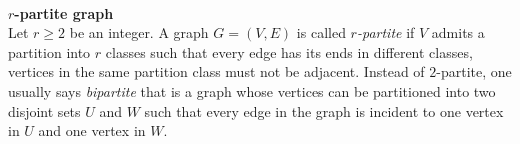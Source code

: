 \documentclass[12pt]{report}
\begin{document}
\\
{\bf $r$-partite graph}\\ Let $r\geq 2$ be an integer. A graph
$G=(V,E)$ is called {\em $r$-partite} if $V$ admits a partition into
$r$ classes such that every edge has its ends in different classes,
vertices in the same partition class must not be adjacent. Instead
of $2$-partite, one usually says {\em bipartite} that is a graph
whose vertices can be partitioned into two disjoint sets $U$ and $W$
such that every edge in the graph is incident to one vertex in $U$
and one vertex in $W$.
\end{document}
